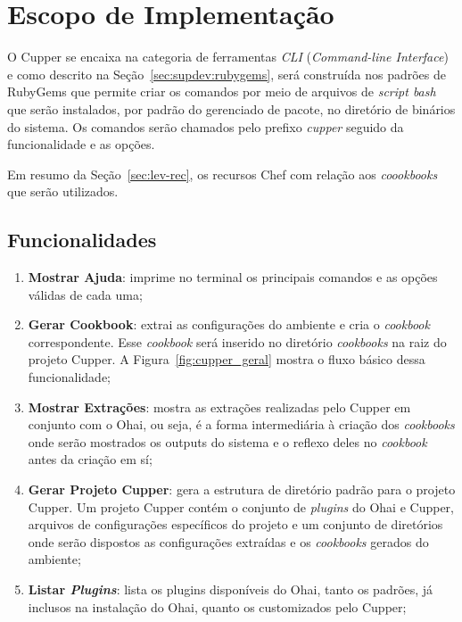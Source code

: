 \section{Escopo de Implementação}
\label{sec:escopo}


O Cupper se encaixa na categoria de ferramentas \textit{CLI} (\textit{Command-line Interface})
e como descrito na Seção~\ref{sec:supdev:rubygems}, será construída nos padrões de
RubyGems que permite criar os comandos por meio de arquivos de \textit{script bash}
que serão instalados, por padrão do gerenciado de pacote, no diretório de binários do sistema.
Os comandos serão chamados pelo prefixo \textit{cupper} seguido da funcionalidade e as opções.


Em resumo da Seção~\ref{sec:lev-rec}, os recursos Chef com relação aos \textit{coookbooks} que serão utilizados.

\subsection{Funcionalidades}

\begin{enumerate}
  \item \textbf{Mostrar Ajuda}: imprime no terminal os principais comandos e as opções válidas de
    cada uma;

  \item \textbf{Gerar Cookbook}: extrai as configurações do ambiente e cria o \textit{cookbook} correspondente.
    Esse \textit{cookbook} será inserido no diretório \textit{cookbooks} na raiz do projeto Cupper.
    A Figura~\ref{fig:cupper_geral} mostra o fluxo básico dessa funcionalidade;

  \item \textbf{Mostrar Extrações}: mostra as extrações realizadas pelo Cupper em conjunto com o Ohai,
    ou seja, é a forma intermediária à criação dos \textit{cookbooks} onde serão mostrados os outputs do
    sistema e o reflexo deles no \textit{cookbook} antes da criação em sí;

  \item \textbf{Gerar Projeto Cupper}: gera a estrutura de diretório padrão para o projeto Cupper.
    Um projeto Cupper contém o conjunto de \textit{plugins} do Ohai e Cupper, arquivos de configurações
    específicos do projeto e um conjunto de diretórios onde serão dispostos as configurações
    extraídas e os \textit{cookbooks} gerados do ambiente;

  \item \textbf{Listar \textit{Plugins}}: lista os plugins disponíveis do Ohai, tanto os padrões, já inclusos
    na instalação do Ohai, quanto os customizados pelo Cupper;

\end{enumerate}

